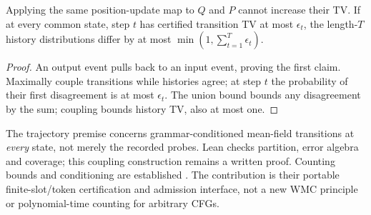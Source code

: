 \begin{theorem}
Applying the same position-update map to $Q$ and $P$ cannot increase their TV.
If at every common state, step $t$ has certified transition TV at most
$\epsilon_t$, the length-$T$ history distributions differ by at most
$\min(1,\sum_{t=1}^{T}\epsilon_t)$.
\end{theorem}
\begin{proof}
An output event pulls back to an input event, proving the first claim.
Maximally couple transitions while histories agree; at step $t$ the probability
of their first disagreement is at most $\epsilon_t$. The union bound bounds
any disagreement by the sum; coupling bounds history TV, also at most one.
\end{proof}
The trajectory premise concerns grammar-conditioned mean-field transitions
at \emph{every} state, not merely the recorded probes. Lean checks partition,
error algebra and coverage; this coupling construction remains a written proof.
Counting bounds and conditioning are established \cite{dubray2024anytime,renkens2014wmc}.
The contribution is their portable finite-slot/token certification and admission
interface, not a new WMC principle or polynomial-time counting for arbitrary CFGs.
